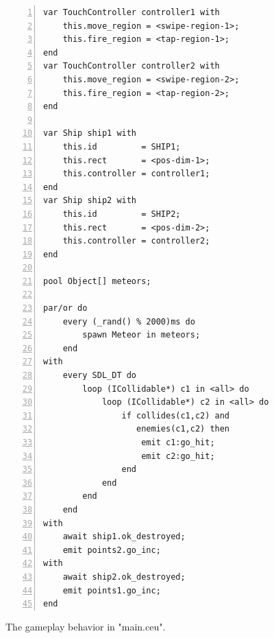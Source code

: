 \documentclass{sigplanconf}
\newcommand{\1}{\;}
\newcommand{\2}{\;\;}
\newcommand{\3}{\;\;\;}
\newcommand{\5}{\;\;\;\;\;}
\begin{document}
\begin{figure}%
\begin{lstlisting}[numbers=left,xleftmargin=3em]
var TouchController controller1 with
    this.move_region = <swipe-region-1>;
    this.fire_region = <tap-region-1>;
end
var TouchController controller2 with
    this.move_region = <swipe-region-2>;
    this.fire_region = <tap-region-2>;
end

var Ship ship1 with
    this.id         = SHIP1;
    this.rect       = <pos-dim-1>;
    this.controller = controller1;
end
var Ship ship2 with
    this.id         = SHIP2;
    this.rect       = <pos-dim-2>;
    this.controller = controller2;
end

pool Object[] meteors;

par/or do
    every (_rand() % 2000)ms do
        spawn Meteor in meteors;
    end
with
    every SDL_DT do
        loop (ICollidable*) c1 in <all> do
            loop (ICollidable*) c2 in <all> do
                if collides(c1,c2) and
                   enemies(c1,c2) then
                    emit c1:go_hit;
                    emit c2:go_hit;
                end
            end
        end
    end
with
    await ship1.ok_destroyed;
    emit points2.go_inc;
with
    await ship2.ok_destroyed;
    emit points1.go_inc;
end
\end{lstlisting}
\caption{ The gameplay behavior in "main.ceu".
\label{lst.apps.rocks.3}
}
\end{figure}
\end{document}
